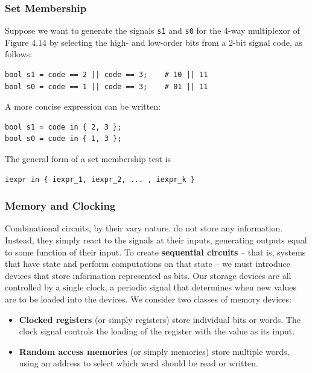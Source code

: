 \documentclass[11pt]{article}
\begin{document}
\subsubsection{Set Membership}
\label{sec:org5af32a0}

Suppose we want to generate the signals \texttt{s1} and \texttt{s0} for the 4-way multiplexor of Figure 4.14 by selecting the high- and low-order bits from a 2-bit signal code, as follows:\\
\begin{verbatim}
bool s1 = code == 2 || code == 3;    # 10 || 11
bool s0 = code == 1 || code == 3;    # 01 || 11
\end{verbatim}

A more concise expression can be written:\\
\begin{verbatim}
bool s1 = code in { 2, 3 };
bool s0 = code in { 1, 3 };
\end{verbatim}

The general form of a set membership test is\\
\begin{verbatim}
iexpr in { iexpr_1, iexpr_2, ... , iexpr_k }
\end{verbatim}


\subsubsection{Memory and Clocking}
\label{sec:orgea76cb8}
Combinational circuits, by their vary nature, do not store any information. Instead, they simply react to the signals at their inputs, generating outputs equal to some function of their input. To create \textbf{sequential circuits} -- that is, systems that have state and perform computations on that state -- we must introduce devices that store information represented as bits. Our storage devices are all controlled by a single clock, a periodic signal that determines when new values are to be loaded into the devices. We consider two classes of memory devices:\\
\begin{itemize}
\item \textbf{Clocked registers} (or simply registers) store individual bits or words. The clock signal controls the loading of the register with the value as its input.\\
\item \textbf{Random access memories} (or simply memories) store multiple words, using an address to select which word should be read or written.\\
\end{itemize}
\end{document}
